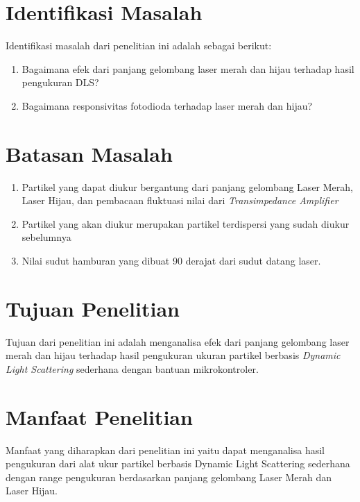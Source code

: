 \section{Identifikasi Masalah}
Identifikasi masalah dari penelitian ini adalah sebagai berikut:
\begin{enumerate}
  \item Bagaimana efek dari panjang gelombang laser merah dan hijau terhadap hasil pengukuran DLS?
  \item Bagaimana responsivitas fotodioda terhadap laser merah dan hijau?
\end{enumerate}

\section{Batasan Masalah}
\begin{enumerate}
    \item Partikel yang dapat diukur bergantung dari panjang gelombang Laser Merah, Laser Hijau,
    dan pembacaan fluktuasi nilai dari \textit{Transimpedance Amplifier}
    \item Partikel yang akan diukur merupakan partikel terdispersi yang sudah diukur sebelumnya
    \item Nilai sudut hamburan yang dibuat 90 derajat dari sudut datang laser.
\end{enumerate}

\section{Tujuan Penelitian}
Tujuan dari penelitian ini adalah menganalisa efek dari panjang gelombang laser merah dan hijau
terhadap hasil pengukuran ukuran partikel berbasis \textit{Dynamic Light Scattering} sederhana
dengan bantuan mikrokontroler.


\section{Manfaat Penelitian}
Manfaat yang diharapkan dari penelitian ini yaitu dapat menganalisa hasil pengukuran dari alat ukur
partikel berbasis Dynamic Light Scattering sederhana dengan range pengukuran berdasarkan panjang
gelombang Laser Merah dan Laser Hijau.
